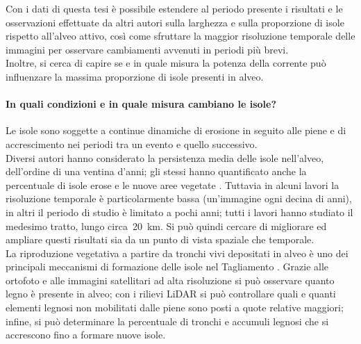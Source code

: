 Con i dati di questa tesi è possibile estendere al periodo presente i risultati e le osservazioni effettuate da altri autori sulla larghezza e sulla proporzione di isole rispetto all'alveo attivo, così come sfruttare la maggior risoluzione temporale delle immagini per osservare cambiamenti avvenuti in periodi più brevi.
\\
Inoltre, si cerca di capire se e in quale misura la potenza della corrente può influenzare la massima proporzione di isole presenti in alveo.%

\paragraph{In quali condizioni e in quale misura cambiano le isole?}
Le isole sono soggette a continue dinamiche di erosione in seguito alle piene e di accrescimento nei periodi tra un evento e quello successivo.
\\
Diversi autori hanno considerato la persistenza media delle isole nell'alveo, dell'ordine di una ventina d'anni; gli stessi hanno quantificato anche la percentuale di isole erose e le nuove aree vegetate .
Tuttavia in alcuni lavori la risoluzione temporale è particolarmente bassa (un'immagine ogni decina di anni), in altri il periodo di studio è limitato a pochi anni; tutti i lavori hanno studiato il medesimo tratto, lungo circa~\SI{20}{\kilo\m}.
Si può quindi cercare di migliorare ed ampliare questi risultati sia da un punto di vista spaziale che temporale.
\\
La riproduzione vegetativa a partire da tronchi vivi depositati in alveo è uno dei principali meccanismi di formazione delle isole nel Tagliamento . 
Grazie alle ortofoto e alle immagini satellitari ad alta risoluzione si può osservare quanto legno è presente in alveo; con i rilievi LiDAR  si può controllare quali e quanti elementi legnosi non mobilitati dalle piene sono posti a quote relative maggiori; infine, si può determinare la percentuale di tronchi e accumuli legnosi che si accrescono fino a formare nuove isole.

